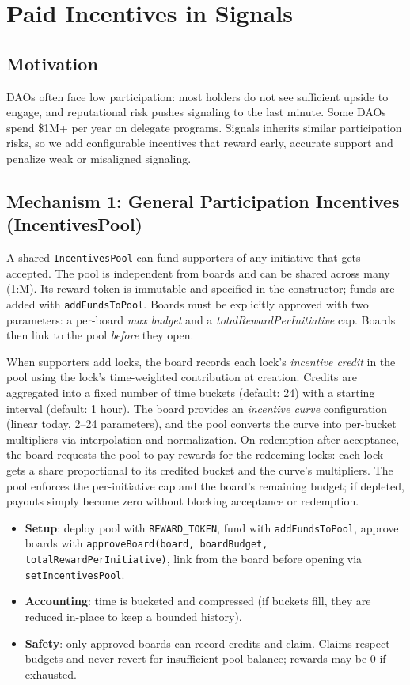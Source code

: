\section{Paid Incentives in Signals}
\subsection{Motivation}
DAOs often face low participation: most holders do not see sufficient upside to engage, and reputational risk pushes signaling to the last minute. Some DAOs spend \$1M+ per year on delegate programs. Signals inherits similar participation risks, so we add configurable incentives that reward early, accurate support and penalize weak or misaligned signaling.

\subsection{Mechanism 1: General Participation Incentives (IncentivesPool)}
A shared \texttt{IncentivesPool} can fund supporters of any initiative that gets accepted. The pool is independent from boards and can be shared across many (1:M). Its reward token is immutable and specified in the constructor; funds are added with \texttt{addFundsToPool}. Boards must be explicitly approved with two parameters: a per-board \emph{max budget} and a \emph{totalRewardPerInitiative} cap. Boards then link to the pool \emph{before} they open.

When supporters add locks, the board records each lock's \emph{incentive credit} in the pool using the lock's time-weighted contribution at creation. Credits are aggregated into a fixed number of time buckets (default: 24) with a starting interval (default: 1 hour). The board provides an \emph{incentive curve} configuration (linear today, 2--24 parameters), and the pool converts the curve into per-bucket multipliers via interpolation and normalization. On redemption after acceptance, the board requests the pool to pay rewards for the redeeming locks: each lock gets a share proportional to its credited bucket and the curve's multipliers. The pool enforces the per-initiative cap and the board's remaining budget; if depleted, payouts simply become zero without blocking acceptance or redemption.

\begin{itemize}[leftmargin=*]
  \item \textbf{Setup}: deploy pool with \texttt{REWARD\_TOKEN}, fund with \texttt{addFundsToPool}, approve boards with \texttt{approveBoard(board, boardBudget, totalRewardPerInitiative)}, link from the board before opening via \texttt{setIncentivesPool}.
  \item \textbf{Accounting}: time is bucketed and compressed (if buckets fill, they are reduced in-place to keep a bounded history).
  \item \textbf{Safety}: only approved boards can record credits and claim. Claims respect budgets and never revert for insufficient pool balance; rewards may be 0 if exhausted.
\end{itemize}

